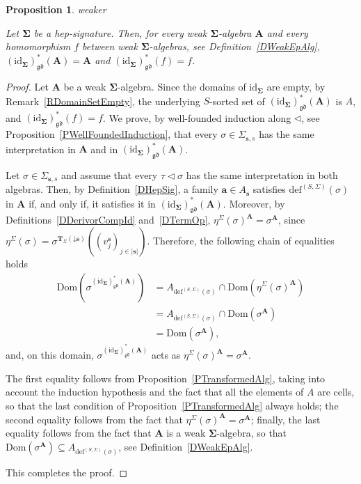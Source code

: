 \documentclass[a4paper, reqno]{amsbook}
\makeatletter
\newcommand{\bb}[1]{\ensuremath{\lvert #1 \rvert}}
\newcommand{\vs}[1]{\mathbin{\downarrow}#1}
\newcommand{\sig}[1]{\mathbf{#1}}             %
\newcommand{\Dom}{\mathrm{Dom}}
\newcommand{\gd}{\mathfrak{gd}}              %
\newcommand{\id}{\mathrm{id}}
\theoremstyle{plain}
\newtheorem{proposition}[theorem]{Proposition}
\theoremstyle{definition}
\newcommand*{\CA@leanpending}{}
\newcommand*{\CA@leanrelation}{}
\newcommand*{\lean}[2]{%
  \ifcsname\string\color@lean@#1\endcsname\else
    \PackageError{main}{Unknown relation `#1' in \string\lean}{Use equivalent, weaker or stronger.}%
  \fi
  \gdef\CA@leanrelation{#1}%
  \gdef\CA@leanpending{#2}}
\makeatother
\begin{document}
\begin{proposition}\label{PGenHepDerivorId}\lean{weaker}{GeneralizedHepDerivor.identityIso,GeneralizedHepDerivor.weakIdentityIso}
Let $\sig{\Sigma}$ be a hep-signature.
Then, for every weak $\sig{\Sigma}$-algebra $\mathbf{A}$ and every homomorphism $f$ between weak $\sig{\Sigma}$-algebras, see Definition~\ref{DWeakEpAlg}, $(\id_{\sig{\Sigma}})^{\ast}_{\gd}(\mathbf{A})=\mathbf{A}$ and $(\id_{\sig{\Sigma}})^{\ast}_{\gd}(f)=f$.
\end{proposition}
\begin{proof}
Let $\mathbf{A}$ be a weak $\sig{\Sigma}$-algebra.
Since the domains of $\id_{\sig{\Sigma}}$ are empty, by Remark~\ref{RDomainSetEmpty}, the underlying $S$-sorted set of $(\id_{\sig{\Sigma}})^{\ast}_{\gd}(\mathbf{A})$ is $A$, and $(\id_{\sig{\Sigma}})^{\ast}_{\gd}(f)=f$.
We prove, by well-founded induction along $\lhd$, see Proposition~\ref{PWellFoundedInduction}, that every $\sigma\in\Sigma_{\mathbf{s},s}$ has the same interpretation in $\mathbf{A}$ and in $(\id_{\sig{\Sigma}})^{\ast}_{\gd}(\mathbf{A})$.

Let $\sigma\in\Sigma_{\mathbf{s},s}$ and assume that every $\tau\lhd\sigma$ has the same interpretation in both algebras.
Then, by Definition~\ref{DHepSig}, a family $\mathbf{a}\in A_{\mathbf{s}}$ satisfies $\mathrm{def}^{(S,\Sigma)}(\sigma)$ in $\mathbf{A}$ if, and only if, it satisfies it in $(\id_{\sig{\Sigma}})^{\ast}_{\gd}(\mathbf{A})$.
Moreover, by Definitions~\ref{DDerivorCompId} and~\ref{DTermOp}, $\eta^{\Sigma}(\sigma)^{\mathbf{A}}=\sigma^{\mathbf{A}}$, since $\eta^{\Sigma}(\sigma)=\sigma^{\mathbf{T}_{\Sigma}(\vs{\mathbf{s}})}((v^{\mathbf{s}}_{j})_{j\in\bb{\mathbf{s}}})$.
Therefore, the following chain of equalities holds
\begin{align*}
\Dom\left(\sigma^{(\id_{\sig{\Sigma}})^{\ast}_{\gd}(\mathbf{A})}\right)
&=
A_{\mathrm{def}^{(S,\Sigma)}(\sigma)}\cap\Dom\left(\eta^{\Sigma}(\sigma)^{\mathbf{A}}\right)
\tag{1}
\\&=
A_{\mathrm{def}^{(S,\Sigma)}(\sigma)}\cap\Dom\left(\sigma^{\mathbf{A}}\right)
\tag{2}
\\&=
\Dom\left(\sigma^{\mathbf{A}}\right),
\tag{3}
\end{align*}
and, on this domain, $\sigma^{(\id_{\sig{\Sigma}})^{\ast}_{\gd}(\mathbf{A})}$ acts as $\eta^{\Sigma}(\sigma)^{\mathbf{A}}=\sigma^{\mathbf{A}}$.

The first equality follows from Proposition~\ref{PTransformedAlg}, taking into account the induction hypothesis and the fact that all the elements of $A$ are cells, so that the last condition of Proposition~\ref{PTransformedAlg} always holds; the second equality follows from the fact that $\eta^{\Sigma}(\sigma)^{\mathbf{A}}=\sigma^{\mathbf{A}}$; finally, the last equality follows from the fact that $\mathbf{A}$ is a weak $\sig{\Sigma}$-algebra, so that $\Dom(\sigma^{\mathbf{A}})\subseteq A_{\mathrm{def}^{(S,\Sigma)}(\sigma)}$, see Definition~\ref{DWeakEpAlg}.

This completes the proof.
\end{proof}
\end{document}
